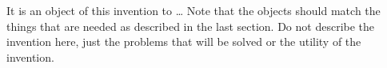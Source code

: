 
\npar It is an object of this invention to \ldots{} Note that the objects should match the things that are needed as described in the last section.  Do not describe the invention here, just the problems that will be solved or the utility of the invention.
